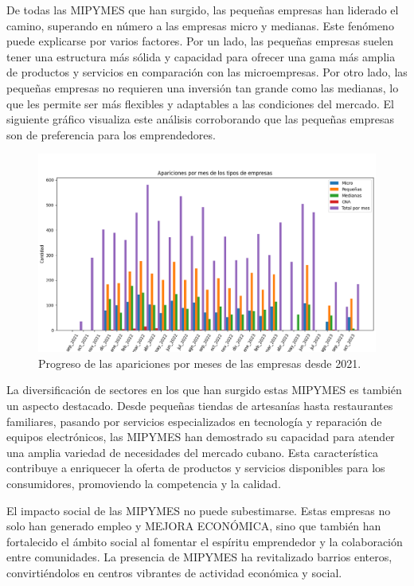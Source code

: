 \documentclass{article}
\begin{document}
 De todas las MIPYMES que han surgido, las pequeñas empresas han liderado el camino, superando en número a las empresas micro y medianas. Este fenómeno puede explicarse por varios factores. Por un lado, las pequeñas empresas suelen tener una estructura más sólida y capacidad para ofrecer una gama más amplia de productos y servicios en comparación con las microempresas. Por otro lado, las pequeñas empresas no requieren una inversión tan grande como las medianas, lo que les permite ser más flexibles y adaptables a las condiciones del mercado. El siguiente gráfico visualiza este análisis corroborando que las pequeñas empresas son de preferencia para los emprendedores. 




\begin{figure}[h]
	\centering
	\includegraphics[width=\textwidth]{Figure_3.png}
	\caption{Progreso de las apariciones por meses de las empresas desde 2021.}
	\label{fig:mi_imagen}
\end{figure}



La diversificación de sectores en los que han surgido estas MIPYMES es también un aspecto destacado. Desde pequeñas tiendas de artesanías hasta restaurantes familiares, pasando por servicios especializados en tecnología y reparación de equipos electrónicos, las MIPYMES han demostrado su capacidad para atender una amplia variedad de necesidades del mercado cubano. Esta característica contribuye a enriquecer la oferta de productos y servicios disponibles para los consumidores, promoviendo la competencia y la calidad.

El impacto social de las MIPYMES no puede subestimarse. Estas empresas no solo han generado empleo y MEJORA ECONÓMICA, sino que también han fortalecido el ámbito social al fomentar el espíritu emprendedor y la colaboración entre comunidades. La presencia de MIPYMES ha revitalizado barrios enteros, convirtiéndolos en centros vibrantes de actividad económica y social.
\end{document}
